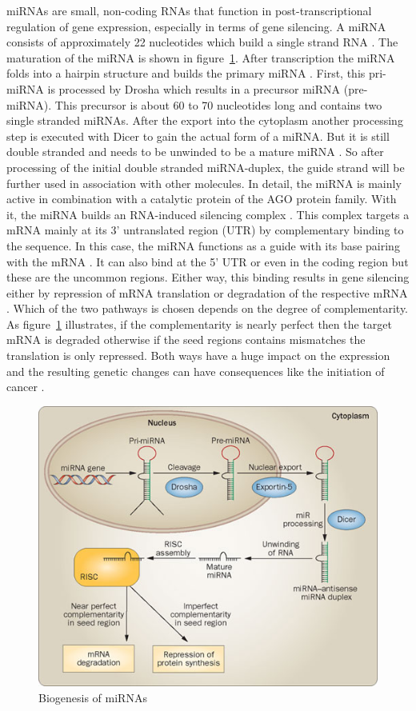 \documentclass[12pt]{article}
\begin{document}
miRNAs are small, non-coding RNAs that function in post-transcriptional regulation of gene expression, especially in terms of gene silencing. A miRNA consists of approximately 22 nucleotides which build a single strand RNA \cite{Bartel}. The maturation of the miRNA is shown in figure~\ref{biogenesis}. After transcription the miRNA folds into a hairpin structure and builds the primary miRNA \cite{Macfarlane}. First, this pri-miRNA is processed by Drosha which results in a precursor miRNA (pre-miRNA). This precursor is about 60 to 70 nucleotides long and contains two single stranded miRNAs. After the export into the cytoplasm another processing step is executed with Dicer to gain the actual form of a miRNA. But it is still double stranded and needs to be unwinded to be a mature miRNA \cite{Macfarlane}. So after processing of the initial double stranded miRNA-duplex, the guide strand will be further used in association with other molecules. In detail, the miRNA is mainly active in combination with a catalytic protein of the AGO protein family. With it, the miRNA builds an RNA-induced silencing complex \cite{Ha}. This complex targets a mRNA mainly at its 3' untranslated region (UTR) by complementary binding to the sequence. In this case, the miRNA functions as a guide with its base pairing with the mRNA \cite{Macfarlane}. It can also bind at the 5' UTR or even in the coding region but these are the uncommon regions. Either way, this binding results in gene silencing either by repression of mRNA translation or degradation of the respective mRNA \cite{Enright}. Which of the two pathways is chosen depends on the degree of complementarity. As figure~\ref{biogenesis} illustrates, if the complementarity is nearly perfect then the target mRNA is degraded otherwise if the seed regions contains mismatches the translation is only repressed. Both ways have a huge impact on the expression and the resulting genetic changes can have consequences like the initiation of cancer \cite{Macfarlane}.\\

\begin{figure}[h]
\centering
\includegraphics[scale=0.5]{results/biogenesis.png}
\caption{Biogenesis of miRNAs}
\label{biogenesis}
\end{figure}  
\end{document}

